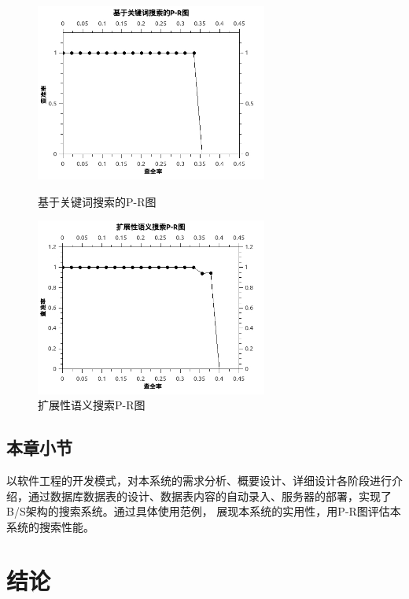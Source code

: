 \documentclass[12pt,a4paper]{article}
\newcommand{\wuhao}{\fontsize{10.5pt}{\baselineskip}\selectfont}
\begin{document}
		
	\begin{figure}[htbp]
	\begin{minipage}[t]{0.5\linewidth}
	\centering
	\includegraphics[width=3in]{fig/KeywordBasedPR.jpg}
	\caption{\wuhao 基于关键词搜索的{\Times P-R}图}
	\label{fig:基于关键词搜索的P-R图}
	\end{minipage}
	\begin{minipage}[t]{0.5\linewidth}
	\centering
	\includegraphics[width=3in]{fig/OntologyBasedPR.jpg}
	\caption{\wuhao 扩展性语义搜索{\Times P-R}图}
	\label{fig:扩展性语义搜索P-R图}
	\end{minipage}
	\end{figure}

	\subsection{本章小节}
	以软件工程的开发模式，对本系统的需求分析、概要设计、详细设计各阶段进行介绍，通过数据库数据表的设计、数据表内容的自动录入、服务器的部署，实现了{\Times B/S}架构的搜索系统。通过具体使用范例，	展现本系统的实用性，用P-R图评估本系统的搜索性能。

\clearpage

\section{结论}
\end{document}

